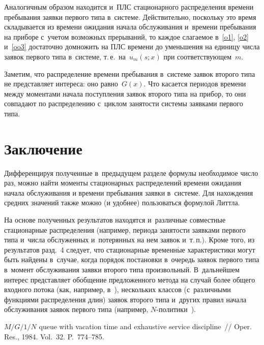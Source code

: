 \begin{multicols}{2}
Аналогичным образом находится и~ПЛС ста\-цио\-нарного распределения 
времени пребывания заявки первого типа в~системе. Действительно,
 поскольку это время  складывается из времени ожидания начала 
 обслуживания и~времени  пребывания на приборе с~учетом возможных 
 прерываний,
то каж\-дое слагаемое в~\eqref{o1}, \eqref{o2} и~\eqref{oo3} достаточно 
домножить на ПЛС времени до уменьшения на единицу числа заявок первого
 типа в~системе, т.\,е.\ на~$u_m(s;x)$ при соответствующем~$m$.

Заметим, что распределение времени пребывания в~системе 
заявок второго типа не представляет интереса: оно равно~$G(x)$.
 Что касается периодов времени между моментами начала поступления заявок 
 второго типа на прибор, то они
совпадают по распределению с~циклом занятости системы заявками 
первого типа.


\section{Заключение}

Дифференцируя полученные в~предыдущем разделе 
формулы необходимое число раз, можно \mbox{найти} моменты стационарных 
распределений времени ожидания начала обслуживания
и времени пребывания заявки в~системе. Для нахождения средних 
значений также можно (и удобнее) пользоваться формулой Литтла.

На основе полученных результатов находятся и~различные совместные 
стационарные распределения (например, периода занятости заявками 
первого типа и~числа обслуженных и~потерянных на нем заявок и~т.\,п.). 
Кроме того, из результатов разд.~4 следует, что стационарные 
временн$\acute{\mbox{ы}}$е характеристики могут быть найдены в~случае, когда порядок 
постановки в~очередь заявок первого типа в~момент обслуживания заявки
 второго типа произвольный. В~дальнейшем интерес представляет обобщение 
 предложенного метода на случай более общего входного потока (как, например, 
 в~\cite{R1,n0}), нескольких классов (с~различными функциями распределения 
 длин) заявок второго типа и~других правил начала обслуживания заявок 
 первого типа (например, $N$-по\-ли\-ти\-ки~\cite{R9}).


{\small\frenchspacing
 {%
 \begin{thebibliography}{99}

 ${M/G/1/N}$ queue with vacation time and 
exhaustive service discipline~// Oper. Res., 1984. Vol.~32. P.~774--785.


\end{thebibliography}}}
\end{multicols}
